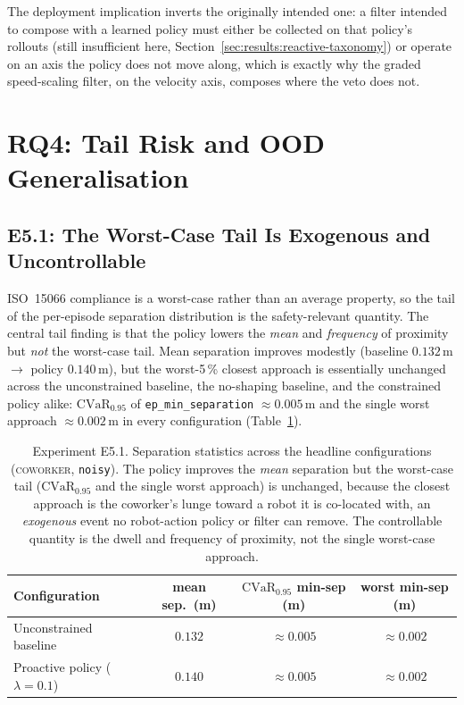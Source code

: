 \documentclass[11pt,a4paper]{report}
\newcommand{\iso}{ISO~15066}
\newcommand{\cvar}{\ensuremath{\mathrm{CVaR}}}
\newcommand{\coworker}{\textsc{coworker}}
\begin{document}
The deployment implication inverts the originally intended one: a
filter intended to compose with a learned policy must either be
collected on that policy's rollouts (still insufficient here,
Section~\ref{sec:results:reactive-taxonomy}) or operate on an axis
the policy does not move along, which is exactly why the graded
speed-scaling filter, on the velocity axis, composes where the veto
does not.

\section{RQ4: Tail Risk and OOD Generalisation}
\label{sec:results:rq4}

\subsection{E5.1: The Worst-Case Tail Is Exogenous and Uncontrollable}
\label{sec:results:tail}

\iso{} compliance is a worst-case rather than an average property, so
the tail of the per-episode separation distribution is the
safety-relevant quantity. The central tail finding is that the policy
lowers the \emph{mean} and \emph{frequency} of proximity but
\emph{not} the worst-case tail. Mean separation improves modestly
(baseline $0.132$\,m $\rightarrow$ policy $0.140$\,m), but the
worst-5\,\% closest approach is essentially unchanged across the
unconstrained baseline, the no-shaping baseline, and the constrained
policy alike: $\cvar_{0.95}$ of \texttt{ep\_min\_separation}
$\approx 0.005$\,m and the single worst approach
$\approx 0.002$\,m in every configuration
(Table~\ref{tab:e5.1-tail}).

\begin{table}[htbp]
\centering
\caption{Experiment E5.1. Separation statistics across the headline
configurations (\coworker{}, \texttt{noisy}). The policy improves the
\emph{mean} separation but the worst-case tail ($\cvar_{0.95}$ and the
single worst approach) is unchanged, because the closest approach is
the coworker's lunge toward a robot it is co-located with, an
\emph{exogenous} event no robot-action policy or filter can remove.
The controllable quantity is the dwell and frequency of proximity, not
the single worst-case approach.}
\label{tab:e5.1-tail}
\small
\begin{tabular}{lccc}
\toprule
Configuration & mean sep.\ (m) & $\cvar_{0.95}$ min-sep (m) & worst min-sep (m) \\
\midrule
Unconstrained baseline             & $0.132$ & $\approx 0.005$ & $\approx 0.002$ \\
Proactive policy ($\lambda{=}0.1$) & $0.140$ & $\approx 0.005$ & $\approx 0.002$ \\
\bottomrule
\end{tabular}
\end{table}
\end{document}
